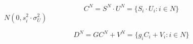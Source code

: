 \begin{equation}
C^N= S^N \cdot U^N = \{ S_i\cdot U_i : i \in N \}
\end{equation}
$N(0, s_i^2 \cdot \sigma^2_U)$

\begin{equation}
D^N= GC^N + V^N = \{ g_i C_i + V_i : i \in N \}
\end{equation}